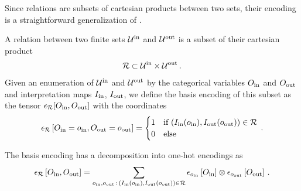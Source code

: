 

Since relations are subsets of cartesian products between two sets, their encoding is a straightforward generalization of .

\begin{definition}
    A relation between two finite sets $\mathcal{U}^{\mathrm{in}}$ and $\mathcal{U}^{\mathrm{out}}$ is a subset of their cartesian product
    \begin{align*}
        \mathcal{R} \subset \mathcal{U}^{\mathrm{in}} \times \mathcal{U}^{\mathrm{out}} \, .
    \end{align*}
    Given an enumeration of $\mathcal{U}^{\mathrm{in}}$ and $\mathcal{U}^{\mathrm{out}}$ by the categorical variables $O_{\mathrm{in}}$ and $O_{\mathrm{out}}$ and interpretation maps $I_{\mathrm{in}}$, $I_{\mathrm{out}}$, we define the basis encoding of this subset as the tensor $\epsilon_{\mathcal{R}}[O_{\mathrm{in}},O_{\mathrm{out}}]$ with the coordinates
    \begin{align*}
        \epsilon_{\mathcal{R}}\left[O_{\mathrm{in}}=o_{\mathrm{in}},O_{\mathrm{out}}=o_{\mathrm{out}}\right]
        = \begin{cases}
              1 & \text{if } (I_{\mathrm{in}}(o_{\mathrm{in}}),I_{\mathrm{out}}(o_{\mathrm{out}})) \in \mathcal{R} \\
              0 & \text{else}
        \end{cases} \, .
    \end{align*}
\end{definition}

The basis encoding has a decomposition into one-hot encodings as
\begin{align*}
    \epsilon_{\mathcal{R}}\left[O_{\mathrm{in}},O_{\mathrm{out}}\right]
    = \sum_{o_{\mathrm{in}},o_{\mathrm{out}} \, : \, (I_{\mathrm{in}}(o_{\mathrm{in}}),I_{\mathrm{out}}(o_{\mathrm{out}})) \in \mathcal{R}}
    \epsilon_{o_{\mathrm{in}}}\left[O_{\mathrm{in}}\right]  \otimes \epsilon_{o_{\mathrm{out}}}\left[O_{\mathrm{out}}\right]  \, .
\end{align*}

